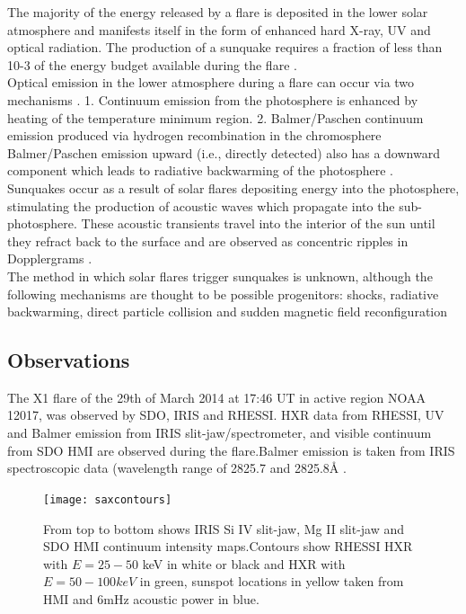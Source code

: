 \documentclass[11pt]{article}
\begin{document}
The majority of the energy released by a flare is deposited in the lower solar atmosphere and manifests itself in the form of enhanced hard X-ray, UV and optical radiation. The production of a sunquake requires a fraction of less than 10-3 of the energy budget available during the flare \citep{2005ApJ...630.1168D}. \\


Optical emission in the lower atmosphere during a flare can occur via two mechanisms \citep{2007ASPC..368..417D}. 
1. Continuum emission from the photosphere is enhanced by heating of the temperature minimum region.
2. Balmer/Paschen continuum emission produced via hydrogen recombination in the chromosphere \\

Balmer/Paschen emission upward (i.e., directly detected) also has a downward component which leads to radiative backwarming of the photosphere \citep{1989SoPh..124..303M}. \\

Sunquakes occur as a result of solar flares depositing energy into the photosphere, stimulating the production of acoustic waves which propagate into the sub-photosphere. These acoustic transients travel into the interior of the sun until they refract back to the surface and are observed as concentric ripples in Dopplergrams \citep{2014arXiv1402.1249K}. \\

The method in which solar flares trigger sunquakes is unknown, although the following mechanisms are thought to be possible progenitors: shocks, radiative backwarming, direct particle collision and sudden magnetic field reconfiguration 



\subsection{Observations}
The X1 flare of the 29th of March 2014 at 17:46 UT in active region NOAA 12017, was observed by SDO, IRIS and RHESSI. HXR data from RHESSI, UV and Balmer emission from IRIS slit-jaw/spectrometer, and visible continuum from SDO HMI are observed during the flare.Balmer emission is taken from IRIS spectroscopic data (wavelength range of 2825.7 and 2825.8Å \citep{2014ApJ...794L..23H}. \\

\begin{figure}\label{saxcontours}
  \begin{center}
  \texttt{[image: saxcontours]}
  \end{center}
  \caption{From top to bottom shows IRIS Si IV slit-jaw, Mg II slit-jaw and SDO HMI continuum intensity maps.Contours show RHESSI HXR with $E = 25-50$ keV in white or black and HXR with $E = 50-100 keV$ in green, sunspot locations in yellow taken from HMI and 6mHz acoustic power in blue.}
\end{figure}
\end{document}
